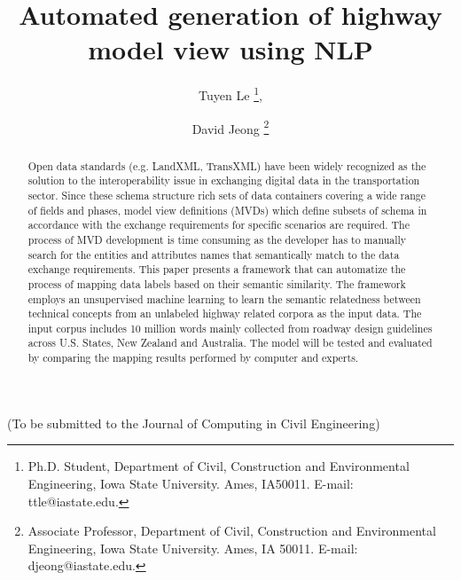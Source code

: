 \documentclass[NewProceedings, InsideFigs]{ascelike} %
\begin{document}
% 
\title{Automated generation of highway model view using NLP}
%
\author{
Tuyen Le
\thanks{
Ph.D. Student, Department of Civil, Construction and Environmental Engineering, Iowa State University. Ames, IA50011. E-mail: ttle@iastate.edu.},
\and
David Jeong%
\thanks{Associate Professor, Department of Civil, Construction and Environmental Engineering, Iowa State University. Ames, IA 50011. E-mail: djeong@iastate.edu.}
 }
 
\maketitle
%
\begin{center}
(To be submitted to the Journal of Computing in Civil Engineering) 
\end{center}
%
\begin{abstract} %
Open data standards (e.g. LandXML, TransXML) have been widely recognized as the solution to the interoperability issue in exchanging digital data in the transportation sector. Since these schema structure rich sets of data containers covering a wide range of fields and phases, model view definitions (MVDs) which define subsets of schema in accordance with the exchange requirements for specific scenarios are required. The process of MVD development is time consuming as the developer has to manually search for the entities and attributes names that semantically match to the data exchange requirements. This paper presents a framework that can automatize the process of mapping data labels based on their semantic similarity. The framework employs an unsupervised machine learning to learn the semantic relatedness between technical concepts from an unlabeled highway related corpora as the input data. The input corpus includes 10 million words mainly collected from roadway design guidelines across U.S. States, New Zealand and Australia. The model will be tested and evaluated by comparing the mapping results performed by computer and experts.   
 
\end{abstract}
%
%



\end{document}
